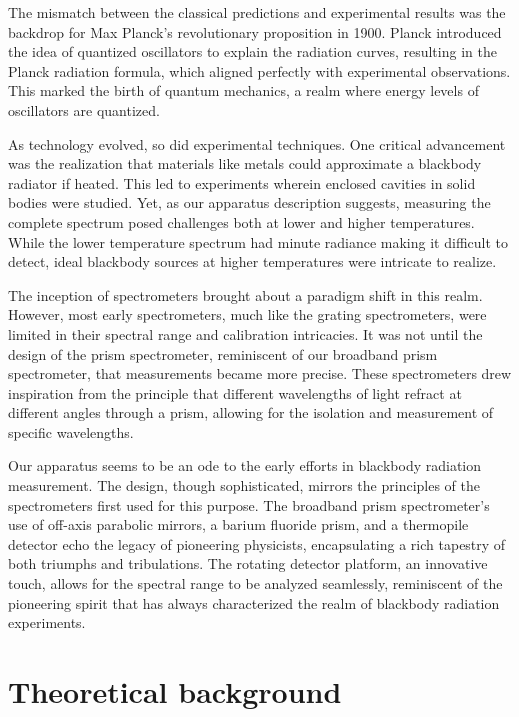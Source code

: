 \documentclass[10pt,letterpaper,onecolumn]{article}
\begin{document}
The mismatch between the classical predictions and experimental results was 
the backdrop for Max Planck's revolutionary proposition in 1900. Planck 
introduced the idea of quantized oscillators to explain the radiation curves, 
resulting in the Planck radiation formula, which aligned perfectly with 
experimental observations. This marked the birth of quantum mechanics, a 
realm where energy levels of oscillators are quantized.

As technology evolved, so did experimental techniques. One critical 
advancement was the realization that materials like metals could approximate 
a blackbody radiator if heated. This led to experiments wherein enclosed 
cavities in solid bodies were studied. Yet, as our apparatus description 
suggests, measuring the complete spectrum posed challenges both at lower 
and higher temperatures. While the lower temperature spectrum had minute 
radiance making it difficult to detect, ideal blackbody sources at higher 
temperatures were intricate to realize.

The inception of spectrometers brought about a paradigm shift in this realm. 
However, most early spectrometers, much like the grating spectrometers, 
were limited in their spectral range and calibration intricacies. 
It was not until the design of the prism spectrometer, reminiscent of our 
broadband prism spectrometer, that measurements became more precise. These 
spectrometers drew inspiration from the principle that different wavelengths 
of light refract at different angles through a prism, allowing for the 
isolation and measurement of specific wavelengths.

Our apparatus seems to be an ode to the early efforts in blackbody 
radiation measurement. The design, though sophisticated, mirrors the 
principles of the spectrometers first used for this purpose. The broadband 
prism spectrometer's use of off-axis parabolic mirrors, a barium fluoride 
prism, and a thermopile detector echo the legacy of pioneering physicists, 
encapsulating a rich tapestry of both triumphs and tribulations. The rotating 
detector platform, an innovative touch, allows for the spectral range to be 
analyzed seamlessly, reminiscent of the pioneering spirit that has always 
characterized the realm of blackbody radiation experiments.


\section{Theoretical background}
\end{document}
